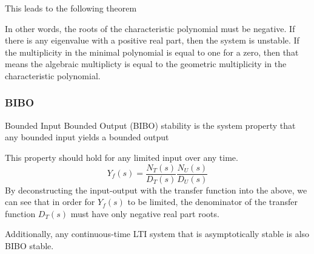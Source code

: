 \documentclass[11pt]{article}
\begin{document}
This leads to the following theorem

In other words, the roots of the characteristic polynomial must be negative.
If there is any eigenvalue with a positive real part, then the system is unstable.
If the multiplicity in the minimal polynomial is equal to one for a zero, then that means the algebraic multiplicty is equal to the geometric multiplicity in the characteristic polynomial.


\subsubsection{BIBO}
Bounded Input Bounded Output (BIBO) stability is the system property that any bounded input yields a bounded output

This property should hold for any limited input over any time.
\begin{equation}
  Y_f(s) = \frac{N_T(s)}{D_T(s)} \frac{N_U(s)}{D_U(s)}
\end{equation}
By deconstructing the input-output with the transfer function into the above, we can see that in order for $Y_f(s)$ to be limited, the denominator of the transfer function $D_T(s)$ must have only negative real part roots.

Additionally, any continuous-time LTI system that is asymptotically stable is also BIBO stable.
\end{document}
